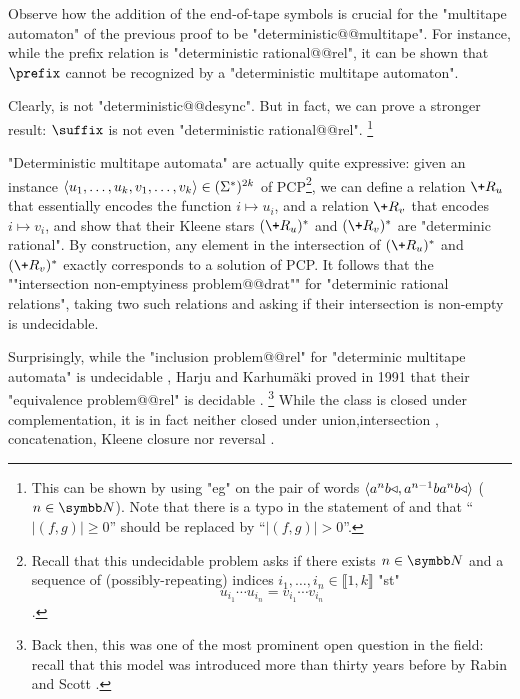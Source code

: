 Observe how the addition of the end-of-tape symbols is crucial for the "multitape automaton"
of the previous proof to be "deterministic@@multitape". For instance, while
the prefix relation is "deterministic rational@@rel", it can be shown that
$\prefix$ cannot be recognized by a "deterministic multitape automaton".

Clearly,  is not "deterministic@@desync".
But in fact, we can prove a stronger result: $\suffix$ is not even "deterministic rational@@rel".%
\footnote{This can be shown by using "eg"
\cite[Lemma~IV.5.15]{Sakarovitch2009Elements} on the pair of words
$\langle a^n b \triangleleft, a^{n-1} b a^n b \triangleleft\rangle$ ($n\in\N$).
Note that there is a typo in
the statement of \cite[Lemma~IV.5.15]{Sakarovitch2009Elements} and that
``$|(f,g)| \geq 0$'' should be replaced by ``$|(f,g)| > 0$''.}

\begin{example}
	\AP\label{ex:PCP-is-det-rat}
	"Deterministic multitape automata" are actually quite expressive:
	given an instance $\langle u_1,\hdots,u_k, v_1,\hdots,v_k\rangle \in (\Sigma^*)^{2k}$ 
	of PCP\footnote{Recall that this undecidable problem asks if there exists $n\in\N$
	and a sequence of (possibly-repeating)
	indices $i_1,\hdots, i_n \in \lBrack 1,k\rBrack$ "st"
	\[u_{i_1}\cdots u_{i_n} = v_{i_1}\cdots v_{i_n}\].},
	we can define a relation $\+R_u$ that essentially encodes the function
	$i \mapsto u_i$, and a relation $\+R_v$ that encodes $i \mapsto v_i$,
	and show that their Kleene stars $(\+R_u)^*$ and $(\+R_v)^*$ are "determinic rational".
	By construction, any element in the intersection of $(\+R_u)^*$ and $(\+R_v)^*$
	exactly corresponds to a solution of PCP.
	It follows that the \AP""intersection non-emptyiness problem@@drat""
	for "determinic rational relations",
	taking two such relations and asking if their intersection is non-empty is undecidable.
\end{example}

Surprisingly, while the "inclusion problem@@rel" for "determinic multitape automata" is undecidable
\cite{FischerRosenberg1968Multitape}, Harju and Karhumäki proved in 1991 that their
"equivalence problem@@rel"
is decidable \cite[Theorem~3.11]{HarjuKarhumaki1991Equivalence}.%
\footnote{Back then, this was one of the most prominent open question in the field: recall that 
this model was introduced more than thirty years before by Rabin
and Scott \cite{RabinScott1959FiniteAutomata}.}
While the class is closed under complementation, it is in fact neither closed under union,intersection \cite[Theorem~17]{RabinScott1959FiniteAutomata},
concatenation, Kleene closure nor reversal
\cite[Table~1]{FischerRosenberg1968Multitape}.

